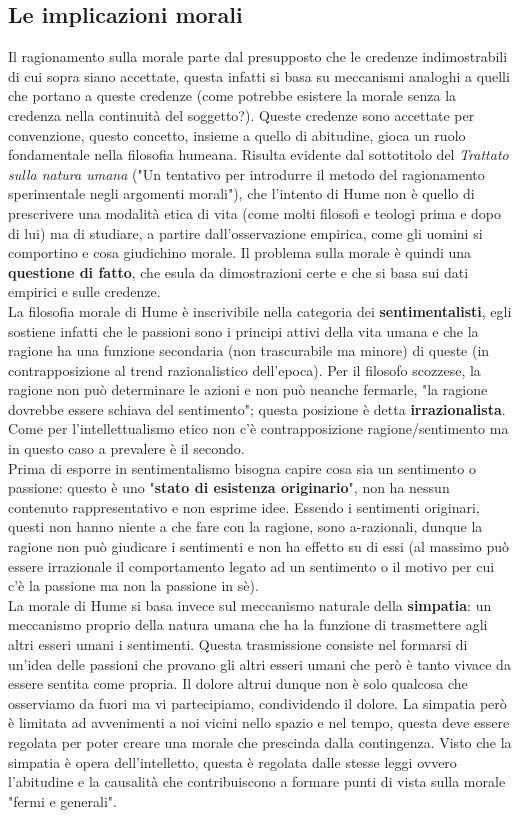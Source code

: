 \documentclass[10pt,a4paper]{article}
\begin{document}
\subsection{Le implicazioni morali}
Il ragionamento sulla morale parte dal presupposto che le credenze indimostrabili di cui sopra siano accettate, questa infatti si basa su meccanismi analoghi a quelli che portano a queste credenze (come potrebbe esistere la morale senza la credenza nella continuità del soggetto?). Queste credenze sono accettate per convenzione, questo concetto, insieme a quello di abitudine, gioca un ruolo fondamentale nella filosofia humeana. Risulta evidente dal sottotitolo del \textit{Trattato sulla natura umana} ("Un tentativo per introdurre il metodo del ragionamento sperimentale negli argomenti morali"), che l'intento di Hume non è quello di prescrivere una modalità etica di vita (come molti filosofi e teologi prima e dopo di lui) ma di studiare, a partire dall'osservazione empirica, come gli uomini si comportino e cosa giudichino morale. Il problema sulla morale è quindi una \textbf{questione di fatto}, che esula da dimostrazioni certe e che si basa sui dati empirici e sulle credenze.\\
La filosofia morale di Hume è inscrivibile nella categoria dei \textbf{sentimentalisti}, egli sostiene infatti che le passioni sono i principi attivi della vita umana e che la ragione ha una funzione secondaria (non trascurabile ma minore) di queste (in contrapposizione al trend razionalistico dell'epoca). Per il filosofo scozzese, la ragione non può determinare le azioni e non può neanche fermarle, "la ragione dovrebbe essere schiava del sentimento"; questa posizione è detta \textbf{irrazionalista}. Come per l'intellettualismo etico non c'è contrapposizione ragione/sentimento ma in questo caso a prevalere è il secondo.\\
Prima di esporre in sentimentalismo bisogna capire cosa sia un sentimento o passione: questo è uno "\textbf{stato di esistenza originario}", non ha nessun contenuto rappresentativo e non esprime idee. Essendo i sentimenti originari, questi non hanno niente a che fare con la ragione, sono a-razionali, dunque la ragione non può giudicare i sentimenti e non ha effetto su di essi (al massimo può essere irrazionale il comportamento legato ad un sentimento o il motivo per cui c'è la passione ma non la passione in sè).\\
La morale di Hume si basa invece sul meccanismo naturale della \textbf{simpatia}: un meccanismo proprio della natura umana che ha la funzione di trasmettere agli altri esseri umani i sentimenti. Questa trasmissione consiste nel formarsi di un'idea delle passioni che provano gli altri esseri umani che però è tanto vivace da essere sentita come propria. Il dolore altrui dunque non è solo qualcosa che osserviamo da fuori ma vi partecipiamo, condividendo il dolore. La simpatia però è limitata ad avvenimenti a noi vicini nello spazio e nel tempo, questa deve essere regolata per poter creare una morale che prescinda dalla contingenza. Visto che la simpatia è opera dell'intelletto, questa è regolata dalle stesse leggi ovvero l'abitudine e la causalità che contribuiscono a formare punti di vista sulla morale "fermi e generali".\\
\end{document}
